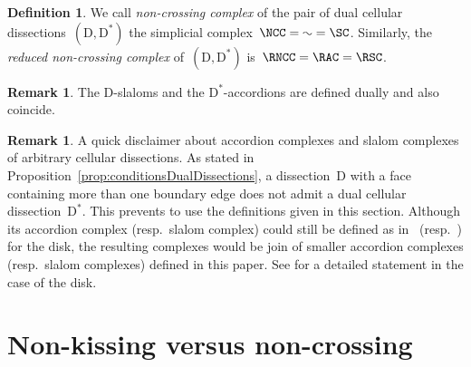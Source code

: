 \documentclass{amsart}
\theoremstyle{definition}
\newtheorem{definition}[theorem]{Definition}
\newtheorem{remark}[theorem]{Remark}
\newcommand{\darkblue}{\color{darkblue}} %
\newcommand{\defn}[1]{\textsl{\darkblue #1}} %
\newcommand{\dual}{^*} %
\newcommand{\dissection}{\mathrm{D}} %
\begin{document}
\begin{definition}
\label{def:noncrossingComplex}
We call \defn{non-crossing complex} of the pair of dual cellular dissections~$(\dissection, \dissection\dual)$ the simplicial complex~$\NCC = \AC = \SC$.
Similarly, the \defn{reduced non-crossing complex} of~$(\dissection, \dissection\dual)$ is~$\RNCC = \RAC = \RSC$.
\end{definition}


\begin{remark}
The $\dissection$-slaloms and the $\dissection\dual$-accordions are defined dually and also coincide.
\end{remark}

\begin{remark}
A quick disclaimer about accordion complexes and slalom complexes of arbitrary cellular dissections.
As stated in Proposition~\ref{prop:conditionsDualDissections}, a dissection~$\dissection$ with a face containing more than one boundary edge does not admit a dual cellular dissection~$\dissection\dual$.
This prevents to use the definitions given in this section.
Although its accordion complex (resp.~slalom complex) could still be defined as in~\cite{MannevillePilaud-accordion} (resp.~\cite{GarverMcConville}) for the disk, the resulting complexes would be join of smaller accordion complexes (resp.~slalom complexes) defined in this paper.
See \cite[Prop.~2.4]{MannevillePilaud-accordion} for a detailed statement in the case of the disk.
\end{remark}

\section{Non-kissing versus non-crossing}
\end{document}
